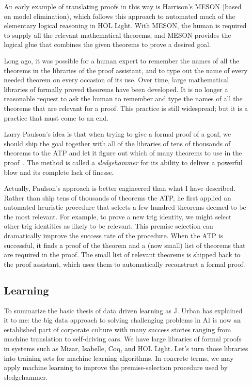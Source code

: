 \documentclass[brochure,english,12pt]{bourbaki}
\theoremstyle{plain}
\begin{document}
An early example of translating proofs in this way is Harrison's MESON (based on model elimination), 
which follows this approach
to automated much of the elementary logical reasoning in HOL Light.  With MESON, the human
is required to supply all the relevant mathematical theorems, and MESON provides the logical
glue that combines the given theorems to prove a desired goal.   

Long ago, it was possible for a human expert to remember the names of all the theorems in the libraries
of the proof assistant, and to type out the name of every needed theorem on every occasion of its use.
Over time, large  mathematical libraries of formally proved theorems have been developed.  It is no longer
a reasonable request to ask the human to remember and type the names of all the theorems that are relevant
for a proof.  
This practice is still widespread; but it is a practice that must come to an end.

Larry Paulson's idea is that when trying to give a formal proof 
of a goal, we should
ship the goal together with all of the libraries of tens of thousands of theorems to the ATP
and let it figure out which of many theorems to use in the proof~\cite{Paar}.  
The method is called a {\it sledgehammer}  for its ability to deliver a powerful blow and its complete lack of finesse.

Actually, Paulson's approach is better engineered than what I have described.  Rather than ship tens of thousands
of theorems the ATP, 
he first applied an automated heuristic procedure that selects a few hundred theorems
deemed to be the most relevant.  For example, to prove a new trig identity, we might select other
trig identities as likely to be relevant.  This premise selection  can dramatically
improve the success rate of the procedure.  When the ATP is successful, it finds
a proof of the theorem and a (now small) list of theorems that are required in the proof.  
The small list of relevant theorems is shipped back to the proof assistant, which uses them to automatically
reconstruct a formal proof.

\subsection{Learning}


To summarize the basic thesis of data driven learning as J. Urban has explained it to me: the big data approach to solving
challenging problems in AI is now  an established part of corporate
culture with many success stories ranging from machine translation to self-driving cars.
We have large libraries of formal proofs in systems such
as Mizar, Isabelle, Coq, and HOL Light.  
Let's turn those libraries into training sets for machine learning algorithms.
In concrete terms, we may apply machine learning to improve the premise-selection procedure
used by sledgehammer.  
\end{document}
